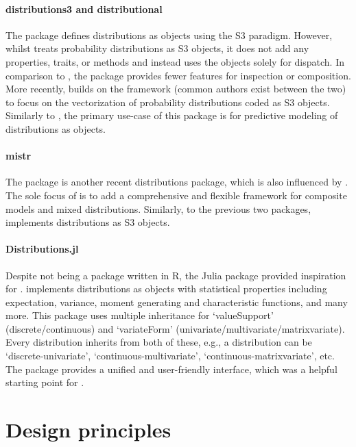 \paragraph{distributions3 and distributional}
The  package \citep{pkgdistributions3} defines distributions as objects using the S3 paradigm. However, whilst  treats probability distributions as S3 objects, it does not add any properties, traits, or methods and instead uses the objects solely for  dispatch. In comparison to , the  package provides fewer features for inspection or composition. More recently,  \citep{pkgdistributional} builds on the  framework (common authors exist between the two) to focus on the vectorization of probability distributions coded as S3 objects. Similarly to , the primary use-case of this package is for predictive modeling of distributions as objects.

\paragraph{mistr}
The  package \citep{pkgmistr} is another recent distributions package, which is also influenced by . The sole focus of  is to add a comprehensive and flexible framework for composite models and mixed distributions. Similarly, to the previous two packages,  implements distributions as S3 objects.

\paragraph{Distributions.jl}
Despite not being a package written in R, the Julia  \citep{pkgdistributions} package provided inspiration for .  implements distributions as objects with statistical properties including expectation, variance, moment generating and characteristic functions, and many more. This package uses multiple inheritance for `valueSupport' (discrete/continuous) and `variateForm' (univariate/multivariate/matrixvariate). Every distribution inherits from both of these, e.g., a distribution can be `discrete-univariate', `continuous-multivariate', `continuous-matrixvariate', etc. The package provides a unified and user-friendly interface, which was a helpful starting point for .

\section{Design principles}
\label{sec:tools_distr6_principles}


